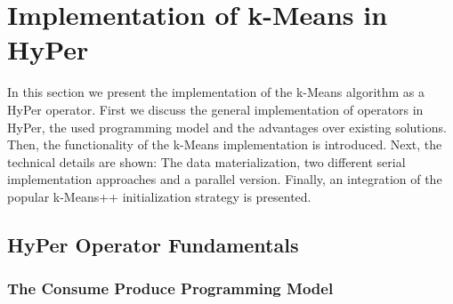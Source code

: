 \chapter{Implementation of k-Means in HyPer}\label{chapter:implementation}

In this section we present the implementation of the k-Means algorithm as a HyPer operator. First we discuss the general implementation of operators in HyPer, the used programming model and the advantages over existing solutions. Then, the functionality of the k-Means implementation is introduced. Next, the technical details are shown: The data materialization, two different serial implementation approaches and a parallel version. Finally, an integration of the popular k-Means++ initialization strategy is presented.


\section{HyPer Operator Fundamentals}\label{section:operator}
\subsection{The Consume Produce Programming Model}

